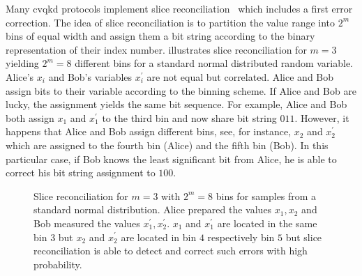 Many \gls{cvqkd} protocols implement slice reconciliation~\cite{Grosshans2002} which includes a first error correction.
The idea of slice reconciliation is to partition the value range into $2^m$ bins of equal width and assign them a bit string according to the binary representation of their index number.
 illustrates slice reconciliation for $m=3$ yielding $2^m=8$ different bins for a standard normal distributed random variable.
Alice's $x_i$ and Bob's variables $x_i^\prime$ are not equal but correlated.
Alice and Bob assign bits to their variable according to the binning scheme.
If Alice and Bob are lucky, the assignment yields the same bit sequence.
For example, Alice and Bob both assign $x_1$ and $x_1^\prime$ to the third bin and now share bit string $011$.
However, it happens that Alice and Bob assign different bins, see, for instance, $x_2$ and $x_2^\prime$ which are assigned to the fourth bin (Alice) and the fifth bin (Bob).
In this particular case, if Bob knows the least significant bit from Alice, he is able to correct his bit string assignment to $100$.
\begin{figure}[htb]
	\centering
	
	\caption{Slice reconciliation for $m=3$ with $2^m=8$ bins for samples from a standard normal distribution. Alice prepared the values $x_1,x_2$ and Bob measured the values $x_1^\prime,x_2^\prime$. $x_1$ and $x_1^\prime$ are located in the same bin $3$ but $x_2$ and $x_2^\prime$ are located in bin $4$ respectively bin $5$ but slice reconciliation is able to detect and correct such errors with high probability.}\label{fig:slice_reconciliation}
\end{figure}

